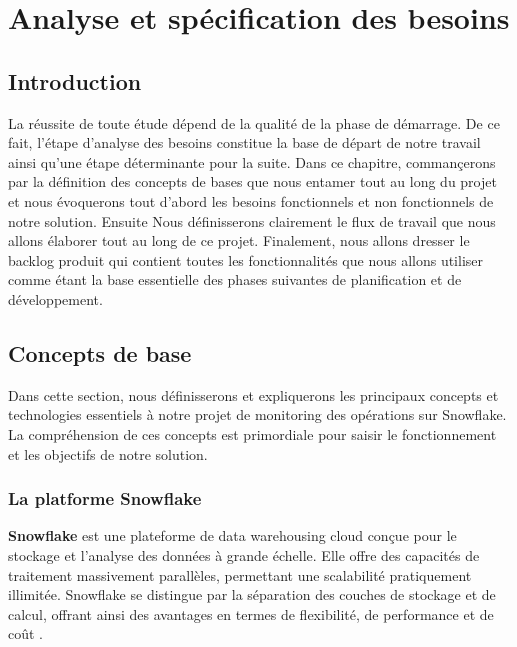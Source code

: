 \chapter{Analyse et spécification des besoins}

\section*{Introduction}
    \par {\huge L}a réussite de toute étude dépend de la qualité de la phase de démarrage. 
    De ce fait, l'étape d'analyse des besoins constitue la base de départ de notre travail 
    ainsi qu'une étape déterminante pour la suite. 
    Dans ce chapitre, commançerons par la définition des concepts de bases que nous entamer tout au long du projet et nous évoquerons tout d'abord les besoins fonctionnels et non
    fonctionnels de notre solution. Ensuite Nous définisserons clairement le flux de travail 
    que nous allons élaborer tout au long de ce projet. Finalement, nous allons dresser le backlog produit qui contient toutes les fonctionnalités que nous
    allons utiliser comme étant la base essentielle des phases suivantes de planification et de développement.
    \section{Concepts de base}

    Dans cette section, nous définisserons et expliquerons les principaux concepts et technologies essentiels à notre projet de monitoring des opérations sur Snowflake. 
    La compréhension de ces concepts est primordiale pour saisir le fonctionnement et les objectifs de notre solution.
    
    \subsection{La platforme Snowflake }
    
    \textbf{Snowflake} est une plateforme de data warehousing cloud conçue pour le stockage et l'analyse des données à grande échelle.
    Elle offre des capacités de traitement massivement parallèles, permettant une scalabilité pratiquement illimitée. 
    Snowflake se distingue par la séparation des couches de stockage et de calcul, offrant ainsi des avantages en termes de flexibilité, de performance et de coût \cite{snowflake}.
    
